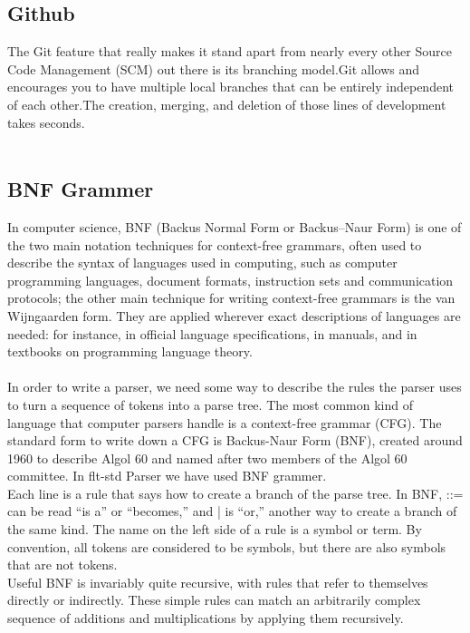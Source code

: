 \subsection{Github}
The Git feature that really makes it stand apart from nearly every other Source Code
Management (SCM) out there is its branching model.Git allows and encourages you to
have multiple local branches that can be entirely independent of each other.The creation,
merging, and deletion of those lines of development takes seconds.\\\\

\subsection{BNF Grammer}
In computer science, BNF (Backus Normal Form or Backus–Naur Form) is one of the two main notation techniques for context-free grammars, often used to describe the syntax of languages used in computing, such as computer programming languages, document formats, instruction sets and communication protocols; the other main technique for writing context-free grammars is the van Wijngaarden form. They are applied wherever exact descriptions of languages are needed: for instance, in official language specifications, in manuals, and in textbooks on programming language theory.\\\\
In order to write a parser, we need some way to describe the rules the parser uses to
turn a sequence of tokens into a parse tree. The most common kind of language that
computer parsers handle is a context-free grammar (CFG). The standard form to write
down a CFG is Backus-Naur Form (BNF), created around 1960 to describe Algol 60
and named after two members of the Algol 60 committee. In flt-std Parser we have used BNF grammer.\\
Each line is a rule that says how to create a branch of the parse tree. In BNF, ::= can
be read “is a” or “becomes,” and | is “or,” another way to create a branch of the same
kind. The name on the left side of a rule is a symbol or term. By convention, all tokens
are considered to be symbols, but there are also symbols that are not tokens.\\
Useful BNF is invariably quite recursive, with rules that refer to themselves directly or
indirectly. These simple rules can match an arbitrarily complex sequence of additions
and multiplications by applying them recursively.\\\\
